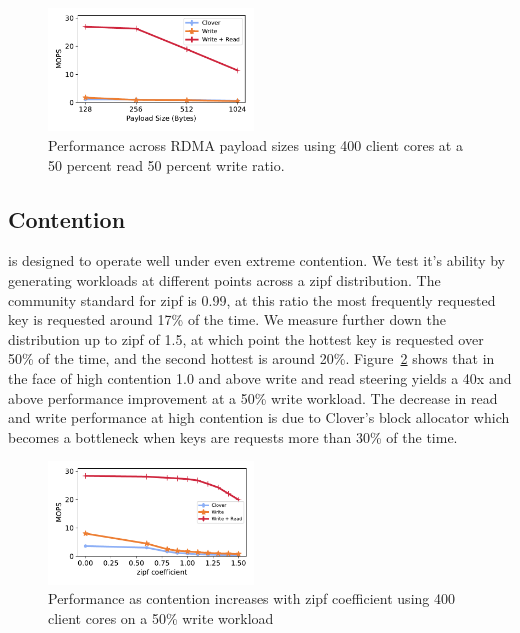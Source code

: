 \begin{figure}
  \centering
  \includegraphics[width=0.485\textwidth]{fig/packet_size.pdf}

    \caption{Performance across RDMA payload sizes using 400 client cores at a
    50 percent read 50 percent write ratio.}

    \label{fig:packet_size}
\end{figure}

\subsection{Contention}

{\sword} is designed to operate well under even extreme contention. We test it's
ability by generating workloads at different points across a zipf distribution.
The community standard for zipf is 0.99, at this ratio the most frequently
requested key is requested around 17\% of the time. We measure further down the
distribution up to zipf of 1.5, at which point the hottest key is requested over
50\% of the time, and the second hottest is around 20\%.
Figure~\ref{fig:contention} shows that in the face of high contention 1.0 and
above write and read steering yields a 40x and above performance improvement at
a 50\% write workload. The decrease in read and write performance at high
contention is due to Clover's block allocator which becomes a bottleneck when
keys are requests more than 30\% of the time.

\begin{figure}
  \centering
  \includegraphics[width=0.485\textwidth]{fig/contention.pdf}

    \caption{Performance as contention increases with zipf coefficient using 400
    client cores on a 50\% write workload}

    \label{fig:contention}
\end{figure}


